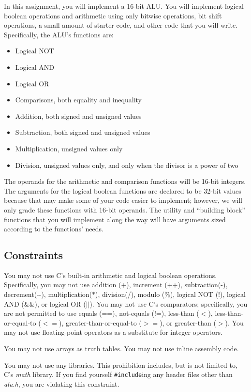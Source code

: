 In this assignment, you will implement a 16-bit ALU\@.
You will implement logical boolean operations and arithmetic using only bitwise operations, bit shift operations, a small amount of starter code, and other code that you will write.
Specifically, the ALU's functions are:
\begin{itemize}
    \item Logical NOT
    \item Logical AND
    \item Logical OR
    \item Comparisons, both equality and inequality
    \item Addition, both signed and unsigned values
    \item Subtraction, both signed and unsigned values
    \item Multiplication, unsigned values only
    \item Division, unsigned values only, and only when the divisor is a power of two
\end{itemize}
The operands for the arithmetic and comparison functions will be 16-bit integers.
The arguments for the logical boolean functions are declared to be 32-bit values because that may make some of your code easier to implement;
however, we will only grade these functions with 16-bit operands.
The utility and ``building block'' functions that you will implement along the way will have arguments sized according to the functions' needs.


\subsection{Constraints}

You may not use C's built-in arithmetic and logical boolean operations.
Specifically, you may not use addition (+), increment (++), subtraction(-), decrement(-{}-), multiplication($*$), division(/), modulo (\%), logical NOT (!), logical AND (\&\&), or logical OR ($||$).
You may not use C's comparators;
specifically, you are not permitted to use equals (==), not-equals (!=), less-than ($<$), less-than-or-equal-to ($<=$), greater-than-or-equal-to ($>=$), or greater-than ($>$).
You may not use floating-point operators as a substitute for integer operators.

You may not use arrays as truth tables.
You may not use inline assembly code.

You may not use any libraries.
This prohibition includes, but is not limited to, C's \textit{math} library.
If you find yourself \lstinline{#include}ing any header files other than \textit{alu.h}, you are violating this constraint.

